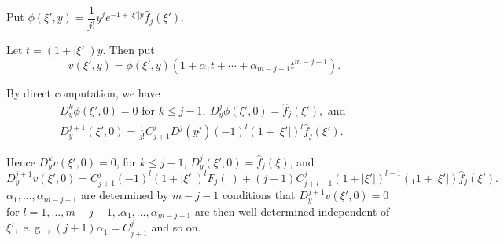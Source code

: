 Put \qquad $\phi (\xi' , y) = \dfrac{1}{j !} y^j e^{-1 + | \xi' | y}
\hat{f}_j (\xi')$.  

Let $t = ( 1 + | \xi' |) y$. Then put
$$
v (\xi' , y) = \phi (\xi' , y ) (1 + \alpha_1 t + \cdots + \alpha_{m
  - j - 1} t ^{m - j - 1}).  
$$

By direct computation, we have
\begin{gather*}
  D^k_y \phi (\xi', 0) = 0 \text { for } k \leq j - 1, ~D^j_y \phi (\xi'
  , 0) = \hat{f}_j (\xi' ), \text { and }\\ 
  D^{j+1}_y (\xi' , 0) = \frac{1}{j !} C^j _{j + 1} D^j (y^j)(-1)^l (1 +
  |\xi'|)^l \hat{f}_j (\xi').  
\end{gather*}

Hence $D^k_y v(\xi' , 0) = 0$, for $k \leq j - 1$, $D^j_y (\xi' , 0) =
\hat{f}_j (\xi)$, and 
$$
D^{j+1}_y v(\xi' , 0) = C^j_{j + 1} (-1)^l (1 + | \xi'|)^l F_j ( ~ ) +
(j + 1) C^j_{j +l-1} (1 + |\xi'|)^{l-1} (_1 1+ |\xi' |) \hat{f}_j
(\xi').  
$$
$\alpha_1, \ldots , \alpha_{m - j - 1}$ are determined by $m-j-1$
conditions that $D^{j+1}_y v (\xi', 0) = 0$ for $l = 1, \ldots ,
m-j-1, . \alpha_1, \ldots , \alpha_{m-j-1}$ are then well-determined
independent of $\xi', $ e. g. , $(j + 1) \alpha_1 = C^j_{j + 1}$ and
so on.  


